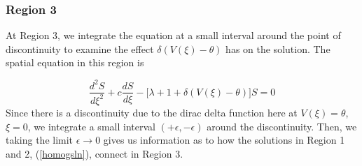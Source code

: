 \documentclass[12pt]{article}
\begin{document}
\subsubsection{Region 3}
At Region 3, we integrate the equation at a small interval around the point of discontinuity to examine the effect $\delta(V(\xi)-\theta)$ has on the solution. The spatial equation in this region is 

\begin{equation}
\frac{d^2S}{d\xi^2} + c\frac{dS}{d\xi} - \big[\lambda + 1 + \delta(V(\xi)-\theta)\big]S = 0
\end{equation} 
Since there is a discontinuity due to the dirac delta function here at $V(\xi) = \theta$, $\xi = 0$, we integrate a small interval $(+\epsilon,-\epsilon)$ around the discontinuity. Then, we taking the limit $\epsilon \to 0$ gives us information as to how the solutions in Region 1 and 2, (\ref{homogsln}), connect in Region 3.
\end{document}
